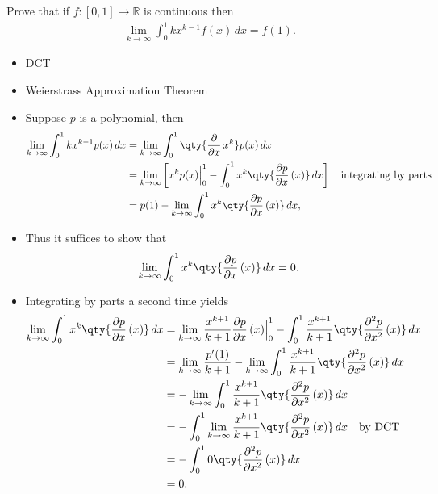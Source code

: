 Prove that if \(f: [0, 1] \to {\mathbb{R}}\) is continuous then
\begin{align*}
\lim_{k\to\infty} \int_0^1 kx^{k-1} f(x) \,dx = f(1)
.\end{align*}

\begin{concept}

\envlist

\begin{itemize}
\tightlist
\item
  DCT
\item
  Weierstrass Approximation Theorem
\end{itemize}

\end{concept}

\begin{solution}

\envlist

\begin{itemize}
\item
  Suppose \(p\) is a polynomial, then
  \begin{align*}
  \lim_{k\to\infty} \int_0^1 kx^{k-1} p(x) \, dx
  &= \lim_{k\to\infty} \int_0^1 \qty{ {\frac{\partial }{\partial x}\,}x^k } p(x) \, dx \\
  &= \lim_{k\to\infty} \left[ x^k p(x) \Big|_0^1 - \int_0^1 x^k \qty{{\frac{\partial p}{\partial x}\,}(x) } \, dx \right] \quad\text{integrating by parts}\\
  &= p(1) - \lim_{k\to\infty} \int_0^1 x^k \qty{{\frac{\partial p}{\partial x}\,}(x) } \, dx
  ,\end{align*}
\item
  Thus it suffices to show that
  \begin{align*}
  \lim_{k\to\infty} \int_0^1 x^k \qty{{\frac{\partial p}{\partial x}\,} (x) } \, dx = 0
  .\end{align*}
\item
  Integrating by parts a second time yields
  \begin{align*}
  \lim_{k\to\infty} 
  \int_0^1 x^k \qty{{\frac{\partial p}{\partial x}\,}(x) } \, dx
  &= \lim_{k\to\infty} 
  {x^{k+1} \over k+1} {\frac{\partial p}{\partial x}\,}(x) \Big|_0^1 - \int_0^1 {x^{k+1} \over k+1} \qty{ {\frac{\partial ^2 p}{\partial x^2}\,}(x)} \, dx \\
  &= \lim_{k\to\infty} {p'(1) \over k+1} - \lim_{k\to\infty} \int_0^1 {x^{k+1} \over k+1} \qty{ {\frac{\partial ^2p}{\partial x^2}\,}(x)} \, dx \\
  &= - \lim_{k\to\infty} \int_0^1 {x^{k+1} \over k+1} \qty{ {\frac{\partial ^2p}{\partial x^2}\,}(x)} \, dx \\
  &= - \int_0^1 \lim_{k\to\infty}  {x^{k+1} \over k+1} \qty{ {\frac{\partial ^2p}{\partial x^2}\,}(x)} \, dx \quad\text{by DCT} \\
  &= - \int_0^1 0 \qty{ {\frac{\partial ^2p}{\partial x^2}\,}(x)} \, dx \\
  &= 0
  .\end{align*}


\end{itemize}
\end{solution}
